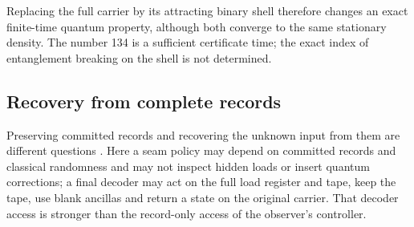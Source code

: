 \documentclass[11pt]{article}
\theoremstyle{definition}
\theoremstyle{remark}
\theoremstyle{plain}
\begin{document}
Replacing the full carrier by its attracting binary shell therefore changes
an exact finite-time quantum property, although both converge to the same
stationary density. The number 134 is a sufficient certificate time; the
exact index of entanglement breaking on the shell is not determined.

\subsection{Recovery from complete records}
\label{sec:recovery}

Preserving committed records and recovering the unknown input from them are
different questions \cite{oRR}. Here a seam policy may depend on committed
records and classical randomness and may not inspect hidden loads or insert
quantum corrections; a final decoder may act on the full load register and
tape, keep the tape, use blank ancillas and return a state on the original
carrier. That decoder access is stronger than the record-only access of the
observer's controller.
\end{document}

